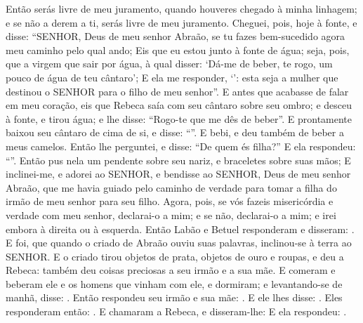 {{{{  Então serás livre de meu juramento, quando houveres chegado à minha linhagem; e se não a derem a ti, serás livre de meu juramento}.
  Cheguei, pois, hoje à fonte, e disse: \enquote{SENHOR, Deus de meu senhor Abraão, se tu fazes bem-sucedido agora meu caminho pelo qual ando;
  Eis que eu estou junto à fonte de água; seja, pois, que a virgem que sair por água, à qual disser: \enquote*{Dá-me de beber, te rogo, um pouco de água de teu cântaro};
  E ela me responder, \enquote*{}: esta seja a mulher que destinou o SENHOR para o filho de meu senhor}.
  E antes que acabasse de falar em meu coração, eis que Rebeca saía com seu cântaro sobre seu ombro; e desceu à fonte, e tirou água; e lhe disse: \enquote{Rogo-te que me dês de beber}.
  E prontamente baixou seu cântaro de cima de si, e disse: \enquote{}. E bebi, e deu também de beber a meus camelos.
  Então lhe perguntei, e disse: \enquote{De quem és filha?} E ela respondeu: \enquote{}. Então pus nela um pendente sobre seu nariz, e braceletes sobre suas mãos;
  E inclinei-me, e adorei ao SENHOR, e bendisse ao SENHOR, Deus de meu senhor Abraão, que me havia guiado pelo caminho de verdade para tomar a filha do irmão de meu senhor para seu filho.
  Agora, pois, se vós fazeis misericórdia e verdade com meu senhor, declarai-o a mim; e se não, declarai-o a mim; e irei embora à direita ou à esquerda}.
  Então Labão e Betuel responderam e disseram: .
  E foi, que quando o criado de Abraão ouviu suas palavras, inclinou-se à terra ao SENHOR.
  E o criado tirou objetos de prata, objetos de ouro e roupas, e deu a Rebeca: também deu coisas preciosas a seu irmão e a sua mãe.
  E comeram e beberam ele e os homens que vinham com ele, e dormiram; e levantando-se de manhã, disse: .
  Então respondeu seu irmão e sua mãe: .
  E ele lhes disse: .
  Eles responderam então: .
  E chamaram a Rebeca, e disseram-lhe:  E ela respondeu: .
}}
